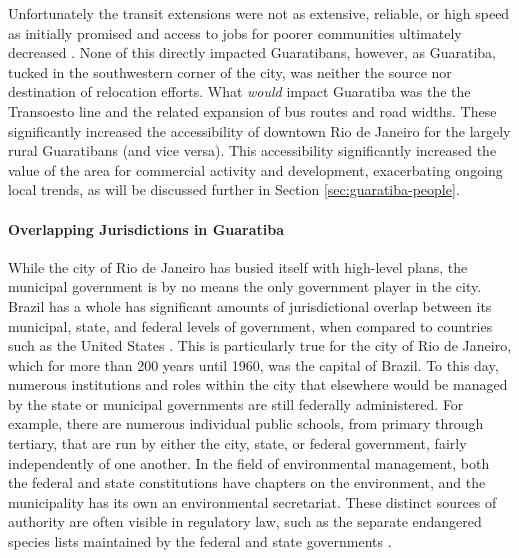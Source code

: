 Unfortunately the transit extensions were not as extensive, reliable, or high speed as initially promised \cite{wattsFuryFrustrationBrazil2014} and access to jobs for poorer communities ultimately decreased \cite{robertsonResultsAreCostly2017}. None of this directly impacted Guaratibans, however, as Guaratiba, tucked in the southwestern corner of the city, was neither the source nor destination of relocation efforts. What \textit{would} impact Guaratiba was the the Transoesto line and the related expansion of bus routes and road widths. These significantly increased the accessibility of downtown Rio de Janeiro for the largely rural Guaratibans (and vice versa). This accessibility significantly increased the value of the area for commercial activity and development, exacerbating ongoing local trends, as will be discussed further in Section \ref{sec:guaratiba-people}.

\paragraph{Overlapping Jurisdictions in Guaratiba} \label{sec:rio-jurisdictions} \leavevmode\newline

While the city of Rio de Janeiro has busied itself with high-level plans, the municipal government is by no means the only government player in the city. Brazil has a whole has significant amounts of jurisdictional overlap between its municipal, state, and federal levels of government, when compared to countries such as the United States \cite{coutoImitationCoercionState2018}. This is particularly true for the city of Rio de Janeiro, which for more than 200 years until 1960, was the capital of Brazil. To this day, numerous institutions and roles within the city that elsewhere would be managed by the state or municipal governments are still federally administered. For example, there are numerous individual public schools, from primary through tertiary, that are run by either the city, state, or federal government, fairly independently of one another. In the field of environmental management, both the federal and state constitutions have chapters on the environment, and the municipality has its own an environmental secretariat. These distinct sources of authority are often visible in regulatory law, such as the separate endangered species lists maintained by the federal \cite{institutochicomendesdeconservacaodabiodiversidadeListaNacionalOficial2014} and state governments \cite{institutoestadualdoambienteListaEspeciesFauna}.

